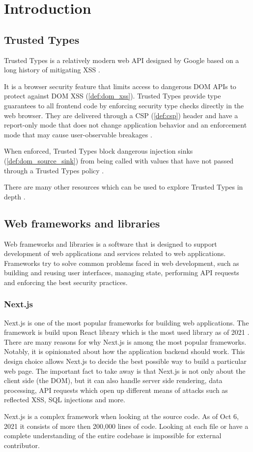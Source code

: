 \chapter{Introduction}

\section{Trusted Types}

Trusted Types is a relatively modern web API designed by Google based on a long history of
mitigating XSS \cite{tt_design_history}.

It is a browser security feature that limits access to dangerous DOM APIs to protect against DOM XSS
(\ref{def:dom_xss}). Trusted Types provide type guarantees to all frontend code by enforcing
security type checks directly in the web browser. They are delivered through a CSP (\ref{def:csp})
header and have a report-only mode that does not change application behavior and an enforcement mode
that may cause user-observable breakages \cite{tt_background}.

When enforced, Trusted Types block dangerous injection sinks (\ref{def:dom_source_sink}) from being
called with values that have not passed through a Trusted Types policy \cite{tt_background}.

There are many other resources which can be used to explore Trusted Types in depth
\cite{tt_resources}.

\section{Web frameworks and libraries}

Web frameworks and libraries is a software that is designed to support development of web
applications and services related to web applications. Frameworks try to solve common problems faced
in web development, such as building and reusing user interfaces, managing state, performing API
requests and enforcing the best security practices.

\subsection{Next.js}
\label{intro-nextjs}

Next.js is one of the most popular frameworks for building web applications. The framework is build
upon React library which is the most used library as of 2021 \cite{react_most_used_2021}. There are
many reasons for why Next.js is among the most popular frameworks. Notably, it is opinionated about
how the application backend should work. This design choice allows Next.js to decide the best
possible way to build a particular web page. The important fact to take away is that Next.js is not
only about the client side (the DOM), but it can also handle server side rendering, data processing,
API requests which open up different means of attacks such as reflected XSS, SQL injections and
more.

Next.js is a complex framework when looking at the source code. As of Oct 6, 2021 it consists of
more then 200,000 lines of code. Looking at each file or have a complete understanding of the
entire codebase is impossible for external contributor.
